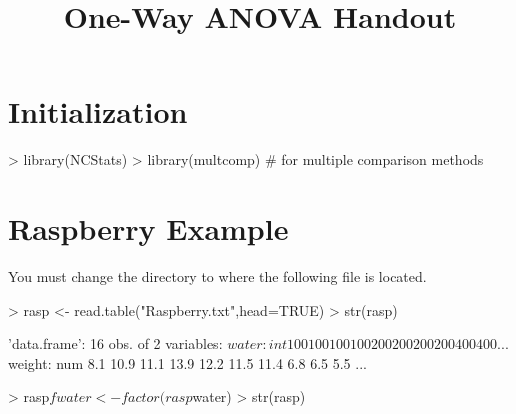 \documentclass[a4paper]{article}
\begin{document}
\title{One-Way ANOVA Handout}
\date{}  %
\maketitle
\vspace{-72pt}


\section{Initialization} \label{sect:Inits}
\vspace{-18pt}
\begin{Schunk}
\begin{Sinput}
> library(NCStats)
> library(multcomp)  # for multiple comparison methods
\end{Sinput}
\end{Schunk}

\vspace{-24pt}
\section{Raspberry Example}
You must change the directory to where the following file is located.
\begin{Schunk}
\begin{Sinput}
> rasp <- read.table("Raspberry.txt",head=TRUE)
> str(rasp)
\end{Sinput}
\begin{Soutput}
'data.frame':	16 obs. of  2 variables:
 $ water : int  100 100 100 100 200 200 200 200 400 400 ...
 $ weight: num  8.1 10.9 11.1 13.9 12.2 11.5 11.4 6.8 6.5 5.5 ...
\end{Soutput}
\begin{Sinput}
> rasp$fwater <- factor(rasp$water)
> str(rasp)
\end{Sinput}
\end{Schunk}

\vspace{-18pt}
\end{document}
